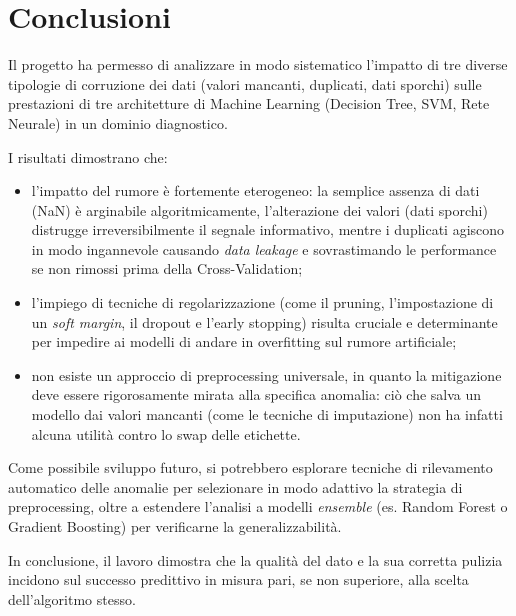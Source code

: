 \documentclass[12pt]{article}
\begin{document}
\section{Conclusioni}

Il progetto ha permesso di analizzare in modo sistematico l'impatto di tre diverse tipologie di corruzione dei dati (valori mancanti, duplicati, dati sporchi) sulle prestazioni di tre architetture di Machine Learning (Decision Tree, SVM, Rete Neurale) in un dominio diagnostico.

I risultati dimostrano che:

\begin{itemize}
    \item l'impatto del rumore è fortemente eterogeneo: la semplice assenza di dati (NaN) è arginabile algoritmicamente, l'alterazione dei valori (dati sporchi) distrugge irreversibilmente il segnale informativo, mentre i duplicati agiscono in modo ingannevole causando \textit{data leakage} e sovrastimando le performance se non rimossi prima della Cross-Validation;
    \item l'impiego di tecniche di regolarizzazione (come il pruning, l'impostazione di un \textit{soft margin}, il dropout e l'early stopping) risulta cruciale e determinante per impedire ai modelli di andare in overfitting sul rumore artificiale;
    \item non esiste un approccio di preprocessing universale, in quanto la mitigazione deve essere rigorosamente mirata alla specifica anomalia: ciò che salva un modello dai valori mancanti (come le tecniche di imputazione) non ha infatti alcuna utilità contro lo swap delle etichette.
\end{itemize}

Come possibile sviluppo futuro, si potrebbero esplorare tecniche di rilevamento automatico delle anomalie per selezionare in modo adattivo la strategia di preprocessing, oltre a estendere l'analisi a modelli \textit{ensemble} (es. Random Forest o Gradient Boosting) per verificarne la generalizzabilità.

\bigbreak
In conclusione, il lavoro dimostra che la qualità del dato e la sua corretta pulizia incidono sul successo predittivo in misura pari, se non superiore, alla scelta dell'algoritmo stesso.
\end{document}
